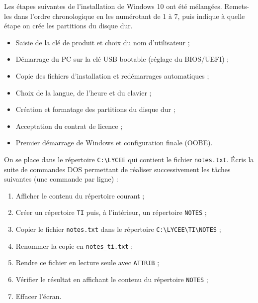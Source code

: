 \documentclass[11pt]{article}
\newcounter{popsec}
\newcounter{popsub}
\newcommand{\courssub}[1]{%
  \stepcounter{popsub}%
  \par\vspace{9pt}\noindent{\popxbold\fontsize{11.5}{13}\selectfont\color{popink}{\color{poporange}\thepopsec.\thepopsub}\hspace{6pt}#1}\par\nopagebreak\vspace{4pt}
}
\begin{document}
\courssub{Je m'entraîne}

\begin{exercice}
Les étapes suivantes de l'installation de Windows 10 ont été mélangées. Remets-les dans l'ordre chronologique en les numérotant de 1 à 7, puis indique à quelle étape on crée les partitions du disque dur.
\begin{itemize}
  \item[a)] Saisie de la clé de produit et choix du nom d'utilisateur ;
  \item[b)] Démarrage du PC sur la clé USB bootable (réglage du BIOS/UEFI) ;
  \item[c)] Copie des fichiers d'installation et redémarrages automatiques ;
  \item[d)] Choix de la langue, de l'heure et du clavier ;
  \item[e)] Création et formatage des partitions du disque dur ;
  \item[f)] Acceptation du contrat de licence ;
  \item[g)] Premier démarrage de Windows et configuration finale (OOBE).
\end{itemize}
\end{exercice}

\begin{exercice}
On se place dans le répertoire \texttt{C:\textbackslash LYCEE} qui contient le fichier \texttt{notes.txt}. Écris la suite de commandes DOS permettant de réaliser successivement les tâches suivantes (une commande par ligne) :
\begin{enumerate}
  \item Afficher le contenu du répertoire courant ;
  \item Créer un répertoire \texttt{TI} puis, à l'intérieur, un répertoire \texttt{NOTES} ;
  \item Copier le fichier \texttt{notes.txt} dans le répertoire \texttt{C:\textbackslash LYCEE\textbackslash TI\textbackslash NOTES} ;
  \item Renommer la copie en \texttt{notes\_ti.txt} ;
  \item Rendre ce fichier en lecture seule avec \texttt{ATTRIB} ;
  \item Vérifier le résultat en affichant le contenu du répertoire \texttt{NOTES} ;
  \item Effacer l'écran.
\end{enumerate}
\end{exercice}
\end{document}
